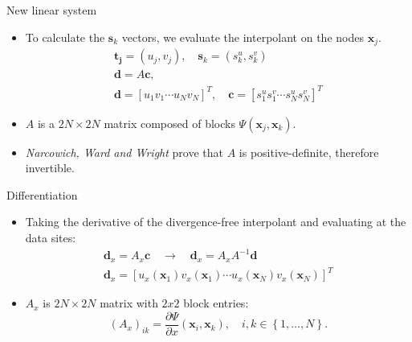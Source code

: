\documentclass{beamer}
\begin{document}
\begin{frame}{New linear system}
  \begin{itemize}
    \item To calculate the $\mathbf{s}_k$ vectors, we evaluate the interpolant
      on the nodes $\mathbf{x}_j$.
      \begin{gather*}
        \mathbf{t_j} = (u_j,v_j), \quad \mathbf{s}_k = (s_k^u,s_k^v)\\
        \mathbf{d} = A\mathbf{c},\\
        \mathbf{d} = [u_1 v_1 \cdots u_N v_N]^{T}, \quad
        \mathbf{c} = [s_1^u s_1^v \cdots s_N^u s_N^v]^{T}
      \end{gather*}

    \item $A$ is a $2N\times 2N$ matrix composed of blocks $\Psi(\mathbf{x}_j,
      \mathbf{x}_k)$.

    \item \emph{Narcowich, Ward and Wright} prove that $A$ is positive-definite,
      therefore invertible.
    \end{itemize}
\end{frame}

\begin{frame}{Differentiation}
  \begin{itemize}
    \item Taking the derivative of the divergence-free interpolant and
      evaluating at the data sites:
      \begin{gather*}
	\mathbf{d}_x = A_x\mathbf{c} \quad \rightarrow \quad \mathbf{d}_x =
	A_x A^{-1}\mathbf{d} \\
	\mathbf{d}_x = [u_x(\mathbf{x}_1) v_x(\mathbf{x}_1) \cdots 
	u_x(\mathbf{x}_N) v_x(\mathbf{x}_N)]^T
      \end{gather*}

    \item $A_x$ is $2N\times 2N$ matrix with $2x2$ block entries:
      \begin{equation*}
        (A_x)_{ik} = \frac{\partial \Psi}{\partial x}
	(\mathbf{x}_i,\mathbf{x}_k), \quad i,k \in \left\{1,\ldots,N\right\}.
      \end{equation*}
  \end{itemize}
\end{frame}
\end{document}
